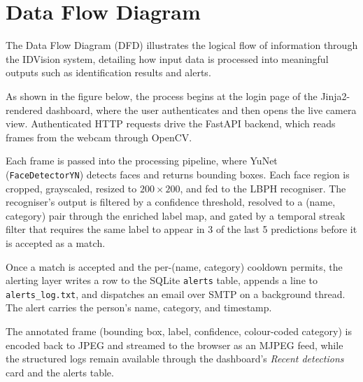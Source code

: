 \documentclass[11pt]{report}
\begin{document}
\section{Data Flow Diagram}

The Data Flow Diagram (DFD) illustrates the logical flow of information through the IDVision system, detailing how input data is processed into meaningful outputs such as identification results and alerts.

As shown in the figure below, the process begins at the login page of the Jinja2-rendered dashboard, where the user authenticates and then opens the live camera view. Authenticated HTTP requests drive the FastAPI backend, which reads frames from the webcam through OpenCV.

Each frame is passed into the processing pipeline, where YuNet (\texttt{FaceDetectorYN}) detects faces and returns bounding boxes. Each face region is cropped, grayscaled, resized to $200\times200$, and fed to the LBPH recogniser. The recogniser's output is filtered by a confidence threshold, resolved to a (name, category) pair through the enriched label map, and gated by a temporal streak filter that requires the same label to appear in 3 of the last 5 predictions before it is accepted as a match.

Once a match is accepted and the per-(name, category) cooldown permits, the alerting layer writes a row to the SQLite \texttt{alerts} table, appends a line to \texttt{alerts\_log.txt}, and dispatches an email over SMTP on a background thread. The alert carries the person's name, category, and timestamp.

The annotated frame (bounding box, label, confidence, colour-coded category) is encoded back to JPEG and streamed to the browser as an MJPEG feed, while the structured logs remain available through the dashboard's \emph{Recent detections} card and the alerts table.
\end{document}
